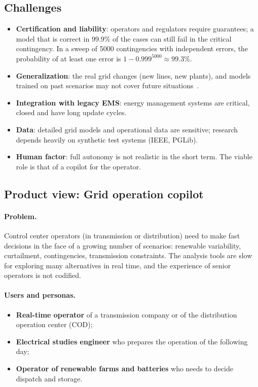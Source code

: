 \documentclass[10pt,a4paper,oneside]{article}
\newcommand{\visaoproduto}[1]{%
  \let\subsectionmarkbase\subsectionmark
  \renewcommand{\subsectionmark}[1]{\markright{\thesubsection\ Product view}}%
  \subsection{Product view: #1}%
  \let\subsectionmark\subsectionmarkbase}
\begin{document}
\subsection{Challenges}
\begin{itemize}
  \item \textbf{Certification and liability}: operators and regulators
    require guarantees; a model that is correct in 99.9\% of the cases can
    still fail in the critical contingency. In a sweep of \num{5000}
    contingencies with independent errors, the probability of at least one
    error is $1 - 0.999^{5000} \approx 99.3\%$.
  \item \textbf{Generalization}: the real grid changes (new lines, new
    plants), and models trained on past scenarios may not cover future
    situations~\cite{gridgeneralization}.
  \item \textbf{Integration with legacy EMS}: energy management systems are
    critical, closed and have long update cycles.
  \item \textbf{Data}: detailed grid models and operational data are
    sensitive; research depends heavily on synthetic test systems (IEEE,
    PGLib).
  \item \textbf{Human factor}: full autonomy is not realistic in the short
    term. The viable role is that of a copilot for the operator.
\end{itemize}

\visaoproduto{Grid operation copilot}

\paragraph{Problem.}
Control center operators (in transmission or distribution) need to make fast
decisions in the face of a growing number of scenarios: renewable
variability, curtailment, contingencies, transmission constraints. The
analysis tools are slow for exploring many alternatives in real time, and
the experience of senior operators is not codified.

\paragraph{Users and personas.}
\begin{itemize}
  \item \textbf{Real-time operator} of a transmission company or of the
    distribution operation center (COD);
  \item \textbf{Electrical studies engineer} who prepares the operation of
    the following day;
  \item \textbf{Operator of renewable farms and batteries} who needs to
    decide dispatch and storage.
\end{itemize}
\end{document}

